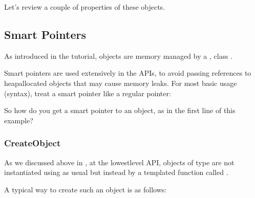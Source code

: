 \documentclass[letterpaper,10pt,english]{sphinxmanual}
\renewcommand{\sphinxcode}[1]{\texttt{\small{#1}}}
\begin{document}
Let’s review a couple of properties of these objects.


\subsection{Smart Pointers}
\label{\detokenize{attributes:smart-pointers}}
As introduced in the  tutorial,  objects are memory managed by a
, class \sphinxcode{}.

Smart pointers are used extensively in the  APIs, to avoid passing
references to heap\sphinxhyphen{}allocated objects that may cause memory leaks.
For most basic usage (syntax), treat a smart pointer like a regular pointer:

\begin{sphinxVerbatim}[commandchars=\\\{\}]
   
 
\end{sphinxVerbatim}

So how do you get a smart pointer to an object, as in the first line
of this example?


\subsubsection{CreateObject}
\label{\detokenize{attributes:createobject}}
As we discussed above in {\hyperref[\detokenize{object-model:memory-management-and-class-ptr}]{}}, at the
lowest\sphinxhyphen{}level API, objects of type \sphinxcode{} are not instantiated
using \sphinxcode{} as usual but instead by a templated function called
\sphinxcode{}.

A typical way to create such an object is as follows:

\begin{sphinxVerbatim}[commandchars=\\\{\}]
    
\end{sphinxVerbatim}
\end{document}
